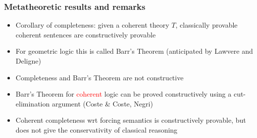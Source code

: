 \documentclass[handout,11pt,hyperref ={colorlinks = true, urlcolor = red}]{beamer}
\newcommand{\red}[1]{\textcolor{red}{#1}}
\begin{document}

\begin{frame}
\frametitle{Metatheoretic results and remarks}
 \begin{itemize}[<+->]   %
    \item Corollary of completeness: given a coherent theory $T$,
    classically provable coherent sentences are constructively provable
    \item For \alert{geometric} logic this is called Barr's Theorem
    (anticipated by Lawvere and Deligne)
    \item Completeness and Barr's Theorem are \alert{not} constructive
    \item Barr's Theorem for \red{coherent} logic can be proved 
    constructively using a cut-elimination argument (Coste \& Coste, Negri) 
    \item Coherent completeness wrt forcing semantics is constructively
    provable, but does not give the conservativity of classical reasoning
  \end{itemize}
\end{frame}
\end{document}
